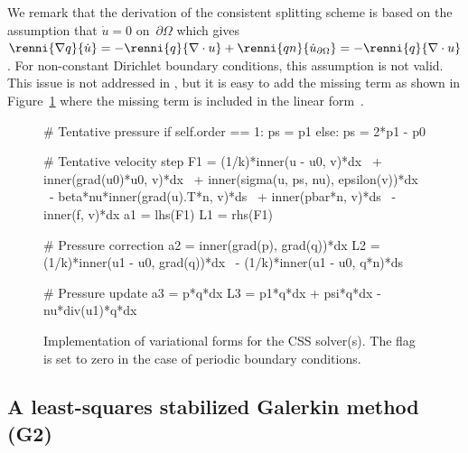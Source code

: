 We remark that the derivation of the consistent splitting scheme is
based on the assumption that $\dot{u} = 0$ on~$\partial\Omega$ which
gives $\renni{\nabla q}{\dot{u}} = -\renni{q}{\nabla \cdot u} +
\renni{qn}{\dot{u}_{\partial \Omega}} = -\renni{q}{\nabla \cdot
  u}$. For non-constant Dirichlet boundary conditions, this assumption
is not valid. This issue is not addressed in \citet{GuermondShen2003}, but it is
easy to add the missing term as shown in Figure~\ref{fig:impl_css}
where the missing term is included in the linear form~.

\begin{figure}
  \begin{center}
    \begin{python}
# Tentative pressure
if self.order == 1:
    ps = p1
else:
    ps = 2*p1 - p0

# Tentative velocity step
F1 = (1/k)*inner(u - u0, v)*dx \
   + inner(grad(u0)*u0, v)*dx \
   + inner(sigma(u, ps, nu), epsilon(v))*dx \
   - beta*nu*inner(grad(u).T*n, v)*ds \
   + inner(pbar*n, v)*ds \
   - inner(f, v)*dx
a1 = lhs(F1)
L1 = rhs(F1)

# Pressure correction
a2 = inner(grad(p), grad(q))*dx
L2 = (1/k)*inner(u1 - u0, grad(q))*dx \
   - (1/k)*inner(u1 - u0, q*n)*ds

# Pressure update
a3 = p*q*dx
L3 = p1*q*dx + psi*q*dx - nu*div(u1)*q*dx
    \end{python}
    \caption{Implementation of variational forms for the CSS
      solver(s). The flag  is set to zero in the case of
      periodic boundary conditions.}
    \label{fig:impl_css}
  \end{center}
\end{figure}

\subsection{A least-squares stabilized Galerkin method (G2)}

